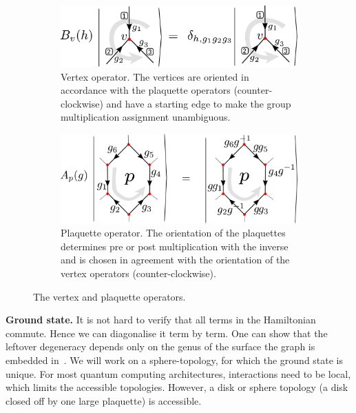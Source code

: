 \documentclass[a4paper,twocolumn,11pt]{quantumarticle}
\begin{document}
\begin{figure}
    \centering
    \begin{subfigure}[b]{0.45\textwidth}
        \centering
        \includegraphics[width= \linewidth]{Figures/B_ops.pdf}
        \caption{Vertex operator. The vertices are oriented in accordance with the plaquette operators (counter-clockwise) and have a starting edge to make the group multiplication assignment unambiguous.}
        \label{eqn:Bs_def}
    \end{subfigure}\hfill
    \begin{subfigure}[b]{0.45\textwidth}
        \centering
        \includegraphics[width = \linewidth]{Figures/A_ops.pdf}
        \caption{Plaquette operator. The orientation of the plaquettes determines pre or post multiplication with the inverse and is chosen in agreement with the orientation of the vertex operators (counter-clockwise).}
        \label{eqn:As_def}
    \end{subfigure}\hfill
    \caption{The vertex and plaquette operators.}
    \label{fig:vertex_ops}
\end{figure}

\textbf{Ground state.}
It is not hard to verify that all terms in the Hamiltonian commute. Hence we can diagonalise it term by term. One can show that the leftover degeneracy depends only on the genus of the surface the graph is embedded in~\cite{Kitaev_2003, cui2018topological}. We will work on a sphere-topology, for which the ground state is unique. For most quantum computing architectures, interactions need to be local, which limits the accessible topologies. However, a disk or sphere topology (a disk closed off by one large plaquette) is accessible.
\end{document}
